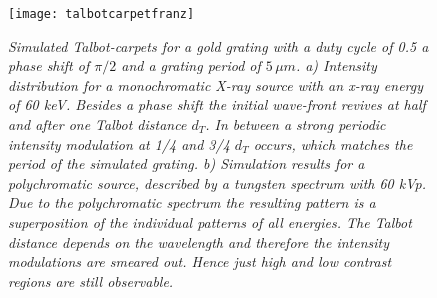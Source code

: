 \begin{figure}[h]
	\begin{center}
		\texttt{[image: talbotcarpetfranz]}
	\end{center}
	\caption[Simulated Talbot-carpets for a grating with a duty cycle of 0.5 a phase shift of $\pi/2$ and a grating period of $5\, \mu m$.]{\textit{Simulated Talbot-carpets for a gold grating with a duty cycle of 0.5 a phase shift of $\pi/2$ and a grating period of $5\, \mu m$. a) Intensity distribution for a monochromatic X-ray source with an x-ray energy of 60 keV. Besides a phase shift the initial wave-front revives at half and after one Talbot distance $d_{T}$. In between a strong periodic intensity modulation at 1/4 and 3/4 $d_{T}$ occurs, which matches the period of the simulated grating. b) Simulation results for a polychromatic source, described by a tungsten spectrum with 60 kVp. Due to the polychromatic spectrum the resulting pattern is a superposition of the individual patterns of all energies. The Talbot distance depends on the wavelength and therefore the intensity modulations are smeared out. Hence just high and low contrast regions are still observable.}}
	\label{talcarp}
\end{figure}
